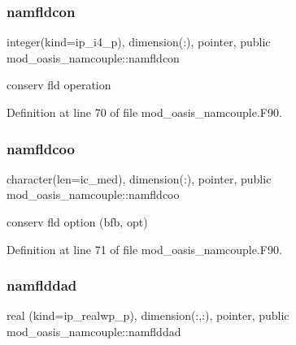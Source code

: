 \mbox{\label{namespacemod__oasis__namcouple_a96aa6a31ef021468f807819a84b327c3}} 
\subsubsection{\texorpdfstring{namfldcon}{namfldcon}}
{\footnotesize\ttfamily integer(kind=ip\+\_\+i4\+\_\+p), dimension(\+:), pointer, public mod\+\_\+oasis\+\_\+namcouple\+::namfldcon}



conserv fld operation 



Definition at line 70 of file mod\+\_\+oasis\+\_\+namcouple.\+F90.

\mbox{\label{namespacemod__oasis__namcouple_a119b86702766d5392cb44856448bcd3e}} 
\subsubsection{\texorpdfstring{namfldcoo}{namfldcoo}}
{\footnotesize\ttfamily character(len=ic\+\_\+med), dimension(\+:), pointer, public mod\+\_\+oasis\+\_\+namcouple\+::namfldcoo}



conserv fld option (bfb, opt) 



Definition at line 71 of file mod\+\_\+oasis\+\_\+namcouple.\+F90.

\mbox{\label{namespacemod__oasis__namcouple_a6500fb8d6da6ed3cf4ec148f38efa704}} 
\subsubsection{\texorpdfstring{namflddad}{namflddad}}
{\footnotesize\ttfamily real (kind=ip\+\_\+realwp\+\_\+p), dimension(\+:,\+:), pointer, public mod\+\_\+oasis\+\_\+namcouple\+::namflddad}



